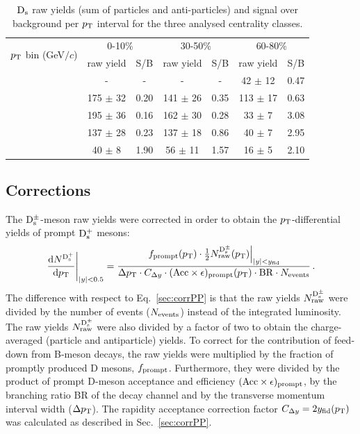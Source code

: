  \begin{table}[!h]
 \begin{center}
  \begin{tabular}{|c|c|c|c|c|c|c|}
\hline
\multirow{2}{*}{$p_{\rm T}$ bin (GeV$/c$)}& \multicolumn{2}{c|}{0-10$\%$} & \multicolumn{2}{c|}{30-50$\%$} & \multicolumn{2}{c|}{60-80$\%$} \\
\cline{2-7}
& raw yield & S/B & raw yield & S/B & raw yield & S/B \\
\hline
\hline
[2,4] & -  & - & -  & - & 42 $\pm$ 12 & 0.47 \\
\hline
[4,6] &  175 $\pm$ 32  & 0.20 & 141 $\pm$ 26  & 0.35 & 113 $\pm$ 17 & 0.63\\
\hline
[6,8] &  195 $\pm$ 36  & 0.16 & 162 $\pm$ 30 & 0.28 & 33 $\pm$ 7 & 3.08 \\
\hline
[8,12] & 137 $\pm$ 28 & 0.23 & 137 $\pm$ 18 & 0.86 & 40 $\pm$ 7 & 2.95 \\
\hline
[12,16] & 40 $\pm$ 8  & 1.90 & 56 $\pm$ 11 & 1.57 & 16 $\pm$ 5 & 2.10 \\
\hline
  \end{tabular}
 \caption{${\rm D_s}$ raw yields (sum of particles and anti-particles) and signal over background per $p_{\rm T}$ interval for the three analysed centrality classes.}
  \label{tab:signalDs_010_3050_6080}
\end{center}
\end{table} 

\subsection{Corrections}
\label{sec:CorrectionsAA}
The ${\rm D_s^{\pm}}$-meson raw yields were corrected in order to obtain the
$p_{\rm T}$-differential yields of prompt ${\rm D_s^+}$ mesons: 
\begin{equation}
  \label{eq:dNdpt}
  \left.\frac{{\rm d} N^{{\rm D_s^+}}}{{\rm d}p_{\rm T}}\right|_{|y|<0.5}=
  \frac{\left.f_{\rm prompt}(p_{\rm T})\cdot \frac{1}{2} N_{\rm raw}^{\rm
        {\rm D_s^{\pm}}}(p_{\rm T})\right|_{|y|<y_{\rm fid}}}{\Delta p_{\rm T} \cdot
   C_{\Delta y} \cdot ({\rm Acc}\times\epsilon)_{\rm prompt}(p_{\rm T})
    \cdot{\rm BR} \cdot N_{\rm events}}\,.
\end{equation}
The difference with respect to Eq.~\ref{sec:corrPP} is that the raw yields $N_{\rm raw}^{\rm {\rm D_s^{\pm}}}$ were divided
by the number of events ($N_{\rm events}$) instead of the integrated luminosity.
The raw yields $N_{\rm raw}^{\rm {\rm D_s^{\pm}}}$ were also divided by 
a factor of two to obtain the charge-averaged (particle and antiparticle) 
yields. To correct for the contribution of feed-down from B-meson decays,
 the raw yields were multiplied by the fraction of promptly produced D 
 mesons, $f_{\rm prompt}$. Furthermore, they were divided by the product 
 of prompt D-meson acceptance and efficiency 
 $({\rm Acc}\times\epsilon)_{\rm prompt}$, by the branching ratio {\rm BR} 
 of the decay channel and by the transverse momentum interval width 
 ($\Delta p_{\rm T}$). The rapidity acceptance 
 correction factor $C_{\Delta y}= 2 y_{\rm fid}(p_{\rm T})$ was calculated as described in Sec.~\ref{sec:corrPP}.

